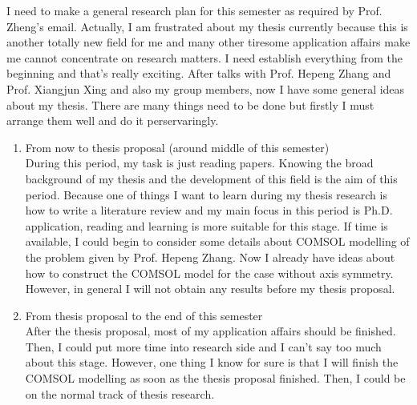 \documentclass[fontsize=11pt, %
                             paper=a4, %
                             twoside, %
                             captions=tableheading,
                             index=totoc,
                             hyperref]{labbook}
\begin{document}
\begin{addmargin}[4cm]{0cm}
I need to make a general research plan for this semester as required by Prof. Zheng's email. Actually, I am frustrated about my thesis currently because this is another totally new field for me and many other tiresome application affairs make me cannot concentrate on research matters. I need establish everything from the beginning and that's really exciting. After talks with Prof. Hepeng Zhang and Prof. Xiangjun Xing and also my group members, now I have some general ideas about my thesis. There are many things need to be done but firstly I must arrange them well and do it perservaringly. 
\begin{enumerate}
\item From now to thesis proposal (around middle of this semester)\\
During this period, my task is just reading papers. Knowing the broad background of my thesis and the development of this field is the aim of this period. Because one of things I want to learn during my thesis research is how to write a literature review and my main focus in this period is Ph.D. application, reading and learning is more suitable for this stage. If time is available, I could begin to consider some details about COMSOL modelling of the problem given by Prof. Hepeng Zhang. Now I already have ideas about how to construct the COMSOL model for the case without axis symmetry. However, in general I will not obtain any results before my thesis proposal.
\item From thesis proposal to the end of this semester\\
After the thesis proposal, most of my application affairs should be finished. Then, I could put more time into research side and I can't say too much about this stage. However, one thing I know for sure is that I will finish the COMSOL modelling as soon as the thesis proposal finished. Then, I could be on the normal track of thesis research.
\end{enumerate}

\end{addmargin}
\end{document}
